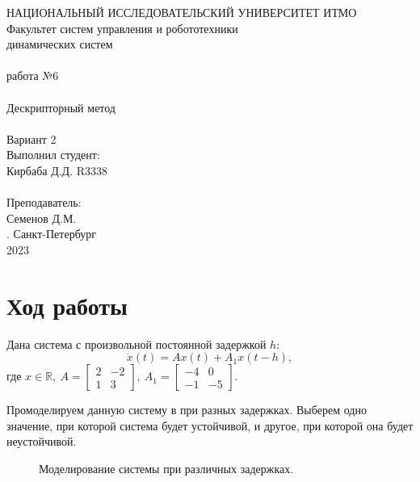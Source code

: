 \documentclass[12pt]{article}
\begin{document}
\begin{titlepage}
\begin{center}
    {\small НАЦИОНАЛЬНЫЙ ИССЛЕДОВАТЕЛЬСКИЙ УНИВЕРСИТЕТ ИТМО} \\
    {\small Факультет систем управления и робототехники} \\
    \vspace*{10\baselineskip}
    { динамических систем} \\
    \ \\
    { работа №6} \\
    \ \\
    {\LARGE Дескрипторный метод} \\
    \ \\
    Вариант 2 \\
    \vspace*{10\baselineskip}
    \hfill {\small Выполнил студент:} \\
    \hfill {\small Кирбаба Д.Д. R3338} \\
    \ \\
    \hfill {\small Преподаватель:} \\
    \hfill {\small Семенов Д.М.} \\
    \mbox{}
    \vfill {. Санкт-Петербург\\2023}
\end{center}
\end{titlepage}

\section*{Ход работы}
Дана система с произвольной постоянной задержкой $h$:
\[
    \dot{x}(t) = Ax(t) + A_1x(t - h),
\]
где $x \in \mathbb{R}, \ A = \begin{bmatrix}
    2 & -2 \\ 1 & 3
\end{bmatrix}, \ A_1 = \begin{bmatrix}
    -4 & 0 \\ -1 & -5
\end{bmatrix}.$

Промоделируем данную систему в при разных задержках. Выберем одно значение, при которой система будет устойчивой, и другое, при которой она будет неустойчивой.
\begin{figure}[H]
    \centering
    \qquad
    \caption{Моделирование системы при различных задержках.}%
    \label{fig:st_ust}
\end{figure}
\end{document}
